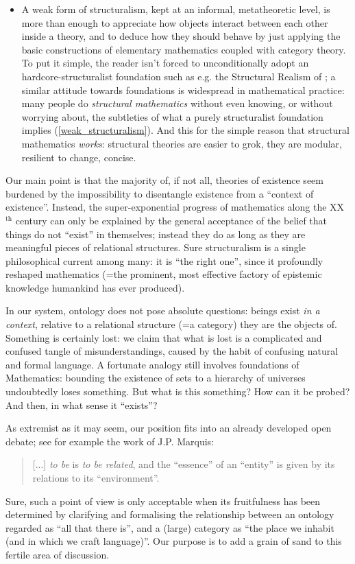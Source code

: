 \begin{itemize}
	\item A weak form of structuralism, kept at an informal, metatheoretic level, is more than enough to appreciate how objects interact between each other inside a theory, and to deduce how they should behave by just applying the basic constructions of elementary mathematics coupled with category theory. To put it simple, the reader isn't forced to unconditionally adopt an hardcore-structuralist foundation such as e.g. the Structural Realism of \cite{bain2013category,eva2016category}; a similar attitude towards foundations is widespread in mathematical practice: many people do \textit{structural mathematics} without even knowing, or without worrying about, the subtleties of what a purely structuralist foundation implies (\autoref{weak_structuralism}). And this for the simple reason that structural mathematics \emph{works}: structural theories are easier to grok, they are modular, resilient to change, concise.
\end{itemize}
Our main point is that the majority of, if not all, theories of existence seem burdened by the impossibility to disentangle existence from a ``context of existence''. Instead, the super-exponential progress of mathematics along the XX$^\text{th}$ century can only be explained by the general acceptance of the belief that things do not ``exist'' in themselves; instead they do as long as they are meaningful pieces of relational structures. Sure structuralism is a single philosophical current among many: it is ``the right one'', since it profoundly reshaped mathematics (=the prominent, most effective factory of epistemic knowledge humankind has ever produced).

In our system, ontology does not pose absolute questions: beings exist \emph{in a context}, relative to a relational structure (=a category) they are the objects of. Something is certainly lost: we claim that what is lost is a complicated and confused tangle of misunderstandings, caused by the habit of confusing natural and formal language. A fortunate analogy still involves foundations of Mathematics: bounding the existence of sets to a hierarchy of universes undoubtedly loses something. But what is this something? How can it be probed? And then, in what sense it ``exists''?

As extremist as it may seem, our position fits into an already developed open debate; see for example the work of J.P. Marquis:
\begin{quote}
	[...] \emph{to be} is \emph{to be related}, and the ``essence'' of an ``entity'' is given by its relations to its ``environment''.
	\hfill \cite{Marquis1997}
\end{quote}
Sure, such a point of view is only acceptable when its fruitfulness has been determined by clarifying and formalising the relationship between an ontology regarded as ``all that there is'', and a (large) category as ``the place we inhabit (and in which we craft language)''. Our purpose is to add a grain of sand to this fertile area of discussion.

